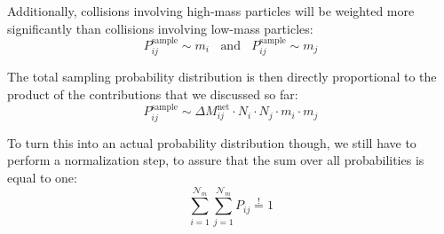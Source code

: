     Additionally, collisions involving high-mass particles will be weighted more significantly 
    than collisions involving low-mass particles:
    \begin{equation}
        P_{ij}^\text{sample} \sim m_i
        \ \ \ \ \text{and} \ \ \ \
        P_{ij}^\text{sample} \sim m_j
    \end{equation}




    

    The total sampling probability distribution is then directly proportional to the product of 
    the contributions that we discussed so far:
    \begin{equation}
        P_{ij}^\text{sample} \sim \Delta M_{ij}^\text{net} \cdot N_i \cdot N_j \cdot m_i \cdot m_j
    \end{equation}

    To turn this into an actual probability distribution though, we still have to perform a 
    normalization step, to assure that the sum over all probabilities is equal to one:
    \begin{equation}
        \sum_{i=1}^{\mathcal N_m}\sum_{j=1}^{\mathcal N_m}P_{ij} \overset{!}{=} 1
    \end{equation}

